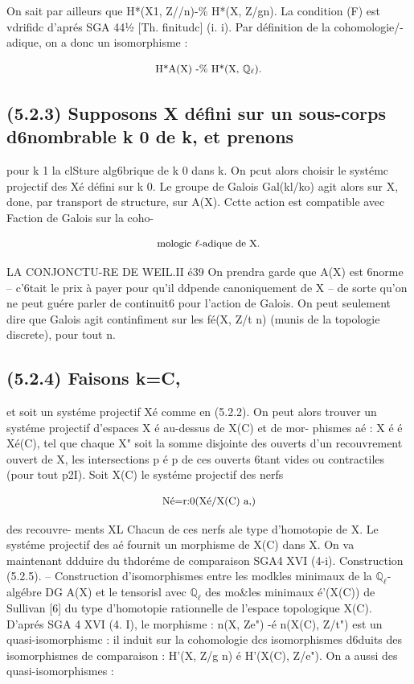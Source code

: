 \documentclass[11pt]{article}
\theoremstyle{remark}
\begin{document}
On sait par ailleurs que H*(X1, Z//n)-\% H*(X, Z/gn). La condition (F) est vdrifidc d'aprés SGA 44½ [Th. finitudc] (i. i). Par définition de la cohomologie/-adique, on a donc un isomorphisme :

\[\text{\small H*A(X) -\% H*(X, \(\mathbb{Q}_{\ell}\)).}\]

\subsection*{(5.2.3) Supposons X défini sur un sous-corps d6nombrable k 0 de k, et prenons}

pour k 1 la clSture alg6brique de k 0 dans k. On pcut alors choisir le systémc projectif des Xé défini sur k 0. Le groupe de Galois Gal(kl/ko) agit alors sur X, done, par transport de structure, sur A(X). Cctte action est compatible avec Faction de Galois sur la coho-

\[\text{\small mologic \(\ell\)-adique de X.}\]

LA CONJONCTU-RE DE WEIL.II é39 On prendra garde que A(X) est 6norme -- c'6tait le prix à payer pour qu'il ddpende canoniquement de X -- de sorte qu'on ne peut guére parler de continuit6 pour l'action de Galois. On peut seulement dire que Galois agit continfiment sur les fé(X, Z/t n) (munis de la topologie discrete), pour tout n.

\subsection*{(5.2.4) Faisons k=C,}

et soit un systéme projectif Xé comme en (5.2.2). On peut alors trouver un systéme projectif d'espaces X é au-dessus de X(C) et de mor- phismes aé : X é é Xé(C), tel que chaque X" soit la somme disjointe des ouverts d'un recouvrement ouvert de X, les intersections p é p de ces ouverts 6tant vides ou contractiles (pour tout p2I). Soit X(C) le systéme projectif des nerfs

\[\text{\small Né=r:0(Xé/X(C) a,)}\]

des recouvre- ments XL Chacun de ces nerfs ale type d'homotopie de X. Le systéme projectif des aé fournit un morphisme de X(C) dans X. On va maintenant ddduire du thdoréme de comparaison SGA4 XVI (4-i). Construction (5.2.5). -- Construction d'isomorphismes entre les modkles minimaux de la \(\mathbb{Q}_{\ell}\)-algébre DG A(X) et le tensorisl avec \(\mathbb{Q}_{\ell}\) des mo\&les minimaux é'(X(C)) de Sullivan [6] du type d'homotopie rationnelle de l'espace topologique X(C). D'aprés SGA 4 XVI (4. I), le morphisme : n(X, Ze") -é n(X(C), Z/t") est un quasi-isomorphismc : il induit sur la cohomologie dcs isomorphismes d6duits des isomorphismes de comparaison : H'(X, Z/g n) é H'(X(C), Z/e"). On a aussi des quasi-isomorphismes :
\end{document}

